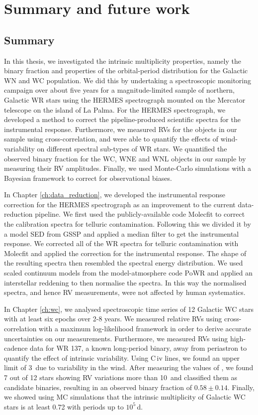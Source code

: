 \chapter{Summary and future work}\label{ch:summary}

\section{Summary}
In this thesis, we investigated the intrinsic multiplicity properties, namely the binary fraction and properties of the orbital-period distribution for the Galactic WN and WC population. We did this by undertaking a spectroscopic monitoring campaign over about five years for a magnitude-limited sample of northern, Galactic WR stars using the HERMES spectrograph mounted on the Mercator telescope on the island of La Palma. For the HERMES spectrograph, we developed a method to correct the pipeline-produced scientific spectra for the instrumental response. Furthermore, we measured RVs for the objects in our sample using cross-correlation, and were able to quantify the effects of wind-variability on different spectral sub-types of WR stars. We quantified the observed binary fraction for the WC, WNE and WNL objects in our sample by measuring their RV amplitudes. Finally, we used Monte-Carlo simulations with a Bayesian framework to correct for observational biases. 

In Chapter \ref{ch:data_reduction}, we developed the instrumental response correction for the HERMES spectrograph as an improvement to the current data-reduction pipeline. We first used the publicly-available code Molecfit to correct the calibration spectra for telluric contamination. Following this we divided it by a model SED from GSSP and applied a median filter to get the instrumental response. We corrected all of the WR spectra for telluric contamination with Molecfit and applied the correction for the instrumental response. The shape of the resulting spectra then resembled the spectral energy distribution. We used scaled continuum models from the model-atmosphere code PoWR and applied an interstellar reddening to then normalise the spectra. In this way the normalised spectra, and hence RV measurements, were not affected by human systematics.

In Chapter \ref{ch:wc}, we analysed spectroscopic time series of 12 Galactic WC stars with at least six epochs over 2-8 years. We measured relative RVs using cross-correlation with a maximum log-likelihood framework in order to derive accurate uncertainties on our measurements. Furthermore, we measured RVs using high-cadence data for WR 137, a known long-period binary, away from periastron to quantify the effect of intrinsic variability. Using C\,{\sc iv} lines, we found an upper limit of 3\,\kms{} due to variability in the wind. After measuring the values of \DelRV{},
we found 7 out of 12 stars showing RV variations more than 10\,\kms{} and classified them as candidate binaries, resulting in an observed binary fraction of $0.58\pm0.14$. Finally, we showed using MC simulations that the intrinsic multiplicity of Galactic WC stars is at least 0.72 with periods up to $10^5$\,d. 

